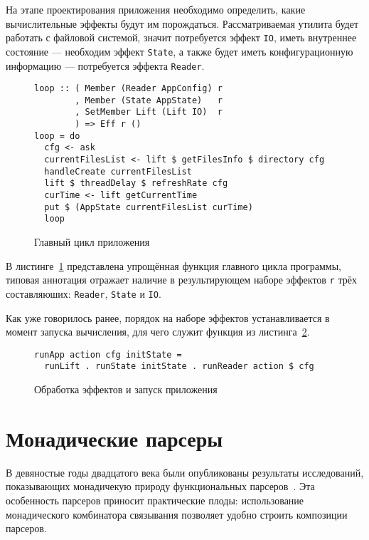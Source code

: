 На этапе проектирования приложения необходимо определить, какие вычислительные
эффекты будут им порождаться. Рассматриваемая утилита будет работать с файловой
системой, значит потребуется эффект \lstinline{IO}, иметь внутреннее 
состояние --- необходим эффект \lstinline{State}, а также будет иметь 
конфигурационную информацию --- потребуется эффекта \lstinline{Reader}.

\begin{figure}[t]
\begin{lstlisting}
loop :: ( Member (Reader AppConfig) r
        , Member (State AppState)   r
        , SetMember Lift (Lift IO)  r
        ) => Eff r ()
loop = do
  cfg <- ask
  currentFilesList <- lift $ getFilesInfo $ directory cfg
  handleCreate currentFilesList
  lift $ threadDelay $ refreshRate cfg
  curTime <- lift getCurrentTime
  put $ (AppState currentFilesList curTime)
  loop
\end{lstlisting}
\caption{Главный цикл приложения}
\label{listing:ftMainLoop}
\end{figure}

В листинге~\ref{listing:ftMainLoop} представлена упрощённая функция главного 
цикла программы, типовая аннотация отражает наличие в результирующем наборе 
эффектов \lstinline{r} трёх составляюших: \lstinline{Reader}, \lstinline{State} 
и \lstinline{IO}.

Как уже говорилось ранее, порядок на наборе эффектов устанавливается в момент 
запуска вычисления, для чего служит функция из листинга~\ref{listing:ftRun}.

\begin{figure}[t]
\begin{lstlisting}
runApp action cfg initState =
  runLift . runState initState . runReader action $ cfg
\end{lstlisting}
\caption{Обработка эффектов и запуск приложения}
\label{listing:ftRun}
\end{figure}

\chapter{Монадические парсеры}

В девяностые годы двадцатого века были опубликованы результаты исследований,
показывающих монадичекую природу функциональных парсеров~\autocite{WadlerMonads}. 
Эта особенность парсеров приносит практические плоды: использование 
монадического комбинатора связывания позволяет удобно строить композиции 
парсеров.

